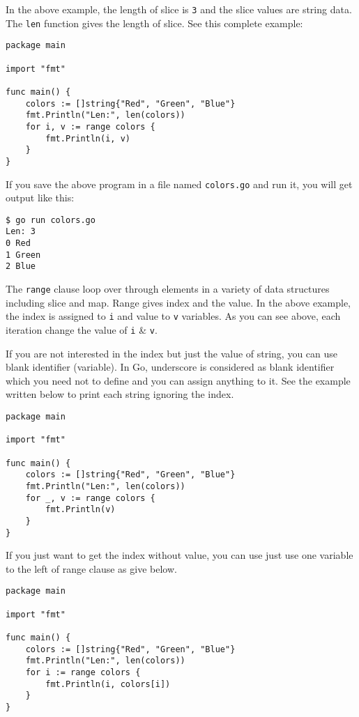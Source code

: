 In the above example, the length of slice is \texttt{3} and the slice
values are string data.  The \texttt{len} function gives the length of
slice.  See this complete example:

\begin{lstlisting}[caption=Printing slice values]
package main

import "fmt"

func main() {
    colors := []string{"Red", "Green", "Blue"}
    fmt.Println("Len:", len(colors))
    for i, v := range colors {
        fmt.Println(i, v)
    }
}
\end{lstlisting}

If you save the above program in a file named \texttt{colors.go} and
run it, you will get output like this:

\begin{lstlisting}[numbers=none]
$ go run colors.go
Len: 3
0 Red
1 Green
2 Blue
\end{lstlisting}

The \texttt{range} clause loop over through elements in a
variety of data structures including slice and map.  Range gives index
and the value.  In the above example, the index is assigned
to \texttt{i} and value to \texttt{v} variables.  As you can see
above, each iteration change the value of \texttt{i} \& \texttt{v}.

If you are not interested in the index but just the value of string,
you can use blank identifier (variable).  In Go, underscore is
considered as blank identifier which you need not to define and you can
assign anything to it.  See the example written below to print each
string ignoring the index.

\begin{lstlisting}[caption=Range loop with index ignored]
package main

import "fmt"

func main() {
    colors := []string{"Red", "Green", "Blue"}
    fmt.Println("Len:", len(colors))
    for _, v := range colors {
        fmt.Println(v)
    }
}
\end{lstlisting}

If you just want to get the index without value, you can use just use
one variable to the left of range clause as give below.

\begin{lstlisting}[caption=Range loop without index]
package main

import "fmt"

func main() {
    colors := []string{"Red", "Green", "Blue"}
    fmt.Println("Len:", len(colors))
    for i := range colors {
        fmt.Println(i, colors[i])
    }
}
\end{lstlisting}


